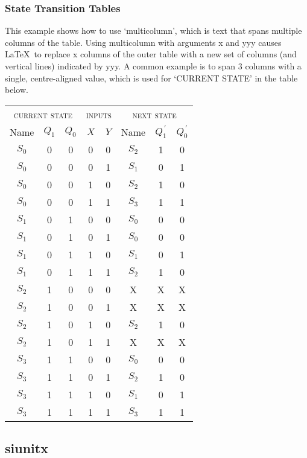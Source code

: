 \documentclass[10pt,\jkfside,a4paper]{article}
\begin{document}
\subsubsection*{State Transition Tables}
This example shows how to use `multicolumn', which is text that spans multiple columns of the table.  Using multicolumn with arguments x and yyy causes \LaTeX\ to replace x columns of the outer table with a new set of columns (and vertical lines) indicated by yyy.  A common example is to span 3 columns with a single, centre-aligned value, which is used for `CURRENT STATE' in the table below.

{\centering\renewcommand{\arraystretch}{1.2}
\begin{tabular}{ccc||cc||ccc}
\multicolumn{3}{c||}{\textsc{current state}} & \multicolumn{2}{c||}{\textsc{inputs}} & \multicolumn{3}{c}{\textsc{next state}} \\
Name & $Q_1$ & $Q_0$ & $X$ & $Y$ & Name & $Q_1^{\,\prime}$ & $Q_0^{\,\prime}$\\
\hhline{===||==||===}
$S_0$ & 0 & 0 & 0 & 0 & $S_2$ & 1 & 0\\
$S_0$ & 0 & 0 & 0 & 1 & $S_1$ & 0 & 1\\
$S_0$ & 0 & 0 & 1 & 0 & $S_2$ & 1 & 0\\
$S_0$ & 0 & 0 & 1 & 1 & $S_3$ & 1 & 1\\
\hhline{---||--||---}
$S_1$ & 0 & 1 & 0 & 0 & $S_0$ & 0 & 0\\
$S_1$ & 0 & 1 & 0 & 1 & $S_0$ & 0 & 0\\
$S_1$ & 0 & 1 & 1 & 0 & $S_1$ & 0 & 1\\
$S_1$ & 0 & 1 & 1 & 1 & $S_2$ & 1 & 0\\
\hhline{---||--||---}
$S_2$ & 1 & 0 & 0 & 0 & X     & X & X\\
$S_2$ & 1 & 0 & 0 & 1 & X     & X & X\\
$S_2$ & 1 & 0 & 1 & 0 & $S_2$ & 1 & 0\\
$S_2$ & 1 & 0 & 1 & 1 & X     & X & X\\
\hhline{---||--||---}
$S_3$ & 1 & 1 & 0 & 0 & $S_0$ & 0 & 0\\
$S_3$ & 1 & 1 & 0 & 1 & $S_2$ & 1 & 0\\
$S_3$ & 1 & 1 & 1 & 0 & $S_1$ & 0 & 1\\
$S_3$ & 1 & 1 & 1 & 1 & $S_3$ & 1 & 1\\
\end{tabular}}

\newpage

\subsection*{siunitx}
\end{document}
